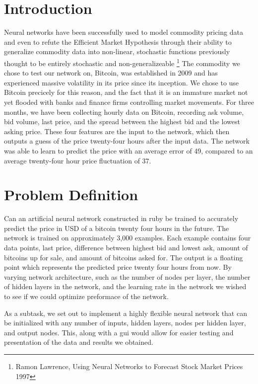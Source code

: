 \documentclass[a4paper,11pt]{article}
\begin{document}
\section{Introduction}
Neural networks have been successfully used to
model commodity pricing data and even to refute the Efficient Market Hypothesis
through their ability to generalize commodity data into non-linear, 
stochastic functions previously thought to be entirely stochastic and non-generalizeable
\footnote{Ramon Lawrence, Using Neural Networks to Forecast Stock Market Prices 1997}
The commodity we chose to test our network on, Bitcoin, was established in 2009 and has 
experienced massive volatility in its price since its inception.  We chose to use Bitcoin 
precicely for this reason, and the fact that it is an immature market not yet flooded with
banks and finance firms controlling market movements.
\newline \newline
For three months, we have been collecting hourly data on Bitcoin, recording
ask volume, bid volume, last price, and the spread between the highest bid and the lowest asking price.
These four features are the input to the network, which then outputs a guess of the price twenty-four
hours after the input data.  The network was able to learn to predict the price with an average error
of 49\cent, compared to an average twenty-four hour price fluctuation of 37\cent. 

\section{Problem Definition}
Can an artificial neural network constructed in ruby be trained to accurately predict the price in USD
of a bitcoin twenty four hours in the future.  The network is trained on approximately 3,000 examples.
Each example contains four data points, last price, difference between highest bid and lowest ask,
amount of bitcoins up for sale, and amount of bitcoins asked for.  The output is a floating point which
represents the predicted price twenty four hours from now. 
By varying network architecture, such as the number of nodes per layer, 
the number of hidden layers in the network, and the learning rate in the network 
we wished to see if we could optimize preformace of the network. 

As a subtask, we set out to implement a highly
flexible neural network that can be initialized with any number of inputs, hidden layers, nodes per hidden
layer, and output nodes.  This, along with a gui would allow for easier testing and presentation of the 
data and results we obtained.
 
\end{document}

